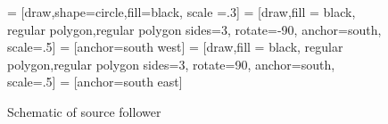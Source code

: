 \begin{figure}[H]
\centering
\newcommand*{\Vg}{Vg $\color{red}$}
\newcommand*{\Rst}{Rst[3] $\color{red}$} 
\newcommand*{\Res}{Res $\color{red}$}
\newcommand*{\VDD}{VDD3.3 $\color{red}$}
\newcommand*{\IN}{IN[i] $\color{red}$}
\newcommand*{\OUT}{OUT[i] $\color{red}$}
\newcommand*{\VBO}{VBO[i] $\color{red}$}
\newcommand*{\gnd}{gnd $\color{red}$}
\newcommand*{\C}{$C_{pf} \color{red}$}




 = [draw,shape=circle,fill=black, scale =.3]
 = [draw,fill = black, regular polygon,regular polygon sides=3, rotate=-90, anchor=south, scale=.5] 
 = [anchor=south west]
 = [draw,fill = black, regular polygon,regular polygon sides=3, rotate=90, anchor=south, scale=.5] 
 = [anchor=south east]
\caption{Schematic of source follower}
\label{tkz:source_follower}
\end{figure}

